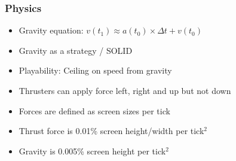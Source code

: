 \begin{frame}
    \frametitle{Physics}
    \begin{itemize}
        \item Gravity equation: $ v(t_1) \approx a(t_0) \times \Delta t + v(t_0)$
        \item Gravity as a strategy / SOLID
        \item Playability: Ceiling on speed from gravity
        \item Thrusters can apply force left, right and up but not down
        \item Forces are defined as screen sizes per tick
        \item Thrust force is 0.01\% screen height/width per tick${}^2$
        \item Gravity is 0.005\% screen height per tick${}^2$
    \end{itemize}
\end{frame}
